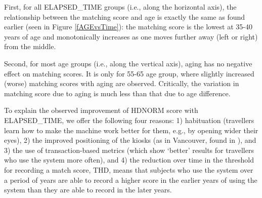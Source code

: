 \documentclass{cta-author}%
\newcommand{\cmt}[1]{}
\begin{document}




First, for all ELAPSED\_TIME groups (i.e., along the horizontal axis), 
the relationship between the matching score and age is exactly the same as found earlier (seen in Figure \ref{fAGEvsTime}):
the matching score is the lowest at 35-40 years of age and monotonically increases as one moves further away (left or right) from the middle. %

Second, for most age groups (i.e., along the vertical axis), aging has no negative effect on matching scores. 
It is only for 55-65 age group, where slightly increased (worse) matching scores with aging are observed.
Critically, the variation in matching score due to aging is much less than that due to age difference.

\cmt{
No increase of HDRAW with ELAPSED\_TIME (i.e., along the vertical axis) for either age group is observed, which 
confirms results reported in \cite{irexVI,aging3}.
 However,  an increase of HDNORM with Age (i.e., along the horizontal axis) for travellers over 40 years of age is observed.
 }


To explain the observed improvement of HDNORM score with ELAPSED\_TIME, we offer the following four reasons: 1) habituation (travellers learn how to make the machine work better for them, e.g., by opening wider their eyes), 2) the improved positioning of the kiosks (as in Vancouver, found in \cite{Bowyer-BTAS2016}), and 3) the use of transaction-based metrics (which show `better' results for travellers who use the system more often), and 4) the reduction over time in the threshold for recording a match score, THD, means that subjects who use the system over a period of years are able to record a higher score in the earlier years of using the system than they are able to record in the later years.
\end{document}
